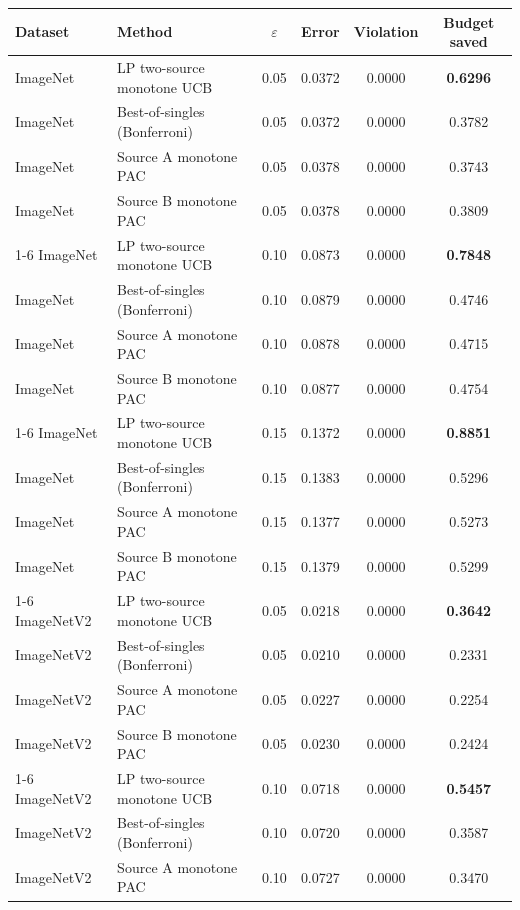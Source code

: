 \documentclass[11pt]{article}
\newcommand{\eps}{\varepsilon}
\begin{document}
\begin{table}[htbp]
\centering
\small
\begin{tabular}{llcccc}
\toprule
Dataset & Method & $\eps$ & Error & Violation & Budget saved \\
\midrule
ImageNet   & LP two-source monotone UCB   & 0.05 & 0.0372 & 0.0000 & \textbf{0.6296} \\
ImageNet   & Best-of-singles (Bonferroni) & 0.05 & 0.0372 & 0.0000 & 0.3782 \\
ImageNet   & Source A monotone PAC        & 0.05 & 0.0378 & 0.0000 & 0.3743 \\
ImageNet   & Source B monotone PAC        & 0.05 & 0.0378 & 0.0000 & 0.3809 \\
\cmidrule(lr){1-6}
ImageNet   & LP two-source monotone UCB   & 0.10 & 0.0873 & 0.0000 & \textbf{0.7848} \\
ImageNet   & Best-of-singles (Bonferroni) & 0.10 & 0.0879 & 0.0000 & 0.4746 \\
ImageNet   & Source A monotone PAC        & 0.10 & 0.0878 & 0.0000 & 0.4715 \\
ImageNet   & Source B monotone PAC        & 0.10 & 0.0877 & 0.0000 & 0.4754 \\
\cmidrule(lr){1-6}
ImageNet   & LP two-source monotone UCB   & 0.15 & 0.1372 & 0.0000 & \textbf{0.8851} \\
ImageNet   & Best-of-singles (Bonferroni) & 0.15 & 0.1383 & 0.0000 & 0.5296 \\
ImageNet   & Source A monotone PAC        & 0.15 & 0.1377 & 0.0000 & 0.5273 \\
ImageNet   & Source B monotone PAC        & 0.15 & 0.1379 & 0.0000 & 0.5299 \\
\cmidrule(lr){1-6}
ImageNetV2 & LP two-source monotone UCB   & 0.05 & 0.0218 & 0.0000 & \textbf{0.3642} \\
ImageNetV2 & Best-of-singles (Bonferroni) & 0.05 & 0.0210 & 0.0000 & 0.2331 \\
ImageNetV2 & Source A monotone PAC        & 0.05 & 0.0227 & 0.0000 & 0.2254 \\
ImageNetV2 & Source B monotone PAC        & 0.05 & 0.0230 & 0.0000 & 0.2424 \\
\cmidrule(lr){1-6}
ImageNetV2 & LP two-source monotone UCB   & 0.10 & 0.0718 & 0.0000 & \textbf{0.5457} \\
ImageNetV2 & Best-of-singles (Bonferroni) & 0.10 & 0.0720 & 0.0000 & 0.3587 \\
ImageNetV2 & Source A monotone PAC        & 0.10 & 0.0727 & 0.0000 & 0.3470 \\

\end{tabular}
\end{table}
\end{document}
